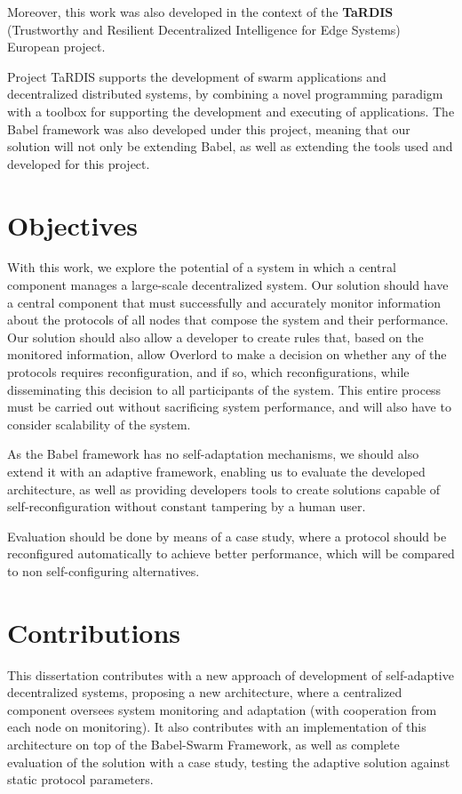 Moreover, this work was also developed in the context of the \textbf{TaRDIS} (Trustworthy and Resilient Decentralized Intelligence for Edge Systems) European project.

Project TaRDIS\cite{TARDIS2023} supports the development of swarm applications and decentralized distributed systems, by combining a novel programming paradigm with a toolbox for supporting the development and executing of applications. The Babel framework was also developed under this project, meaning that our solution will not only be extending Babel, as well as extending the tools used and developed for this project.


\section*{Objectives}
\label{sec:objectives}
With this work, we explore the potential of a system in which a central component manages a large-scale decentralized system. Our solution should have a central component that must successfully and accurately monitor information about the protocols of all nodes that compose the system and their performance. Our solution should also allow a developer to create rules that, based on the monitored information, allow Overlord to make a decision on whether any of the protocols requires reconfiguration, and if so, which reconfigurations, while disseminating this decision to all participants of the system. This entire process must be carried out without sacrificing system performance, and will also have to consider scalability of the system.

As the Babel\cite{Fouto2022} framework has no self-adaptation mechanisms, we should also extend it with an adaptive framework, enabling us to evaluate the developed architecture, as well as providing developers tools to create solutions capable of self-reconfiguration without constant tampering by a human user.

Evaluation should be done by means of a case study, where a protocol should be reconfigured automatically to achieve better performance, which will be compared to non self-configuring alternatives.

\section*{Contributions}
\label{sec:contributions}

This dissertation contributes with a new approach of development of self-adaptive decentralized systems, proposing a new architecture, where a centralized component oversees system monitoring and adaptation (with cooperation from each node on monitoring). It also contributes with an implementation of this architecture on top of the Babel-Swarm Framework\cite{Fouto2022,Galvao2024}, as well as complete evaluation of the solution with a case study, testing the adaptive solution against static protocol parameters.

